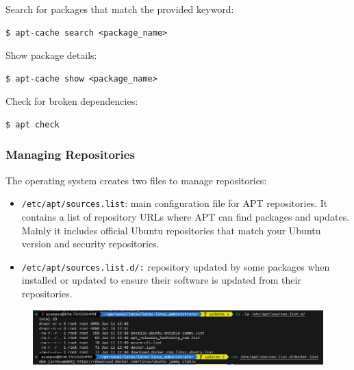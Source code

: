 \documentclass{article}
\newenvironment{codetemplate}[1][]{%
  \mybasecolorbox[#1]
  \itshape
}{%
  \endmybasecolorbox
}
\begin{document}
Search for packages that match the provided keyword:
\begin{codetemplate}
\begin{verbatim}
$ apt-cache search <package_name>
\end{verbatim}
\end{codetemplate}

Show package details:
\begin{codetemplate}
\begin{verbatim}
$ apt-cache show <package_name>
\end{verbatim}
\end{codetemplate}

Check for broken dependencies:
\begin{codetemplate}
\begin{verbatim}
$ apt check
\end{verbatim}
\end{codetemplate}

\subsubsection{Managing Repositories}

The operating system creates two files to manage repositories:

\begin{itemize}
    \item \verb|/etc/apt/sources.list|: main configuration file for APT repositories. It contains a list of repository URLs where APT can find packages and updates. Mainly it includes official Ubuntu repositories that match your Ubuntu version and security repositories.
    \item \verb|/etc/apt/sources.list.d/:| repository updated by some packages when installed or updated to ensure their software is updated from their repositories. 
\end{itemize}

\begin{figure}[H]
    \includegraphics[width=\textwidth]{pictures/apt.png}
    \centering
\end{figure}
\end{document}
